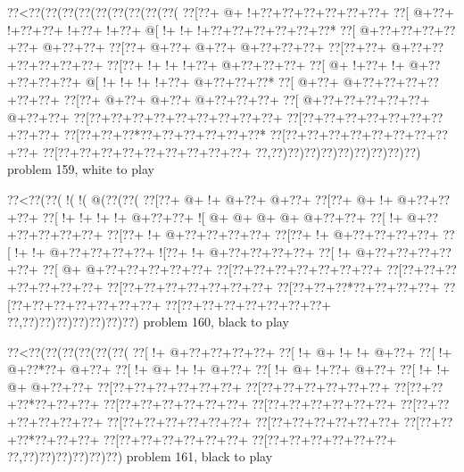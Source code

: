 \vbox{\vbox{\goo
\0??<\0??(\0??(\0??(\0??(\0??(\0??(\0??(\0??(\0??(
\0??[\0??+\- @+\- !+\0??+\0??+\0??+\0??+\0??+\0??+
\0??[\- @+\0??+\- !+\0??+\0??+\- !+\0??+\- !+\0??+
\- @[\- !+\- !+\- !+\0??+\0??+\0??+\0??+\0??+\0??*
\0??[\- @+\0??+\0??+\0??+\0??+\0??+\- @+\0??+\0??+
\0??[\0??+\- @+\0??+\- @+\0??+\- @+\0??+\0??+\0??+
\0??[\0??+\0??+\- @+\0??+\0??+\0??+\0??+\0??+\0??+
\0??[\0??+\- !+\- !+\- !+\0??+\- @+\0??+\0??+\0??+
\0??[\- @+\- !+\0??+\- !+\- @+\0??+\0??+\0??+\0??+
\- @[\- !+\- !+\- !+\- !+\0??+\- @+\0??+\0??+\0??*
\0??[\- @+\0??+\- @+\0??+\0??+\0??+\0??+\0??+\0??+
\0??[\0??+\- @+\0??+\- @+\0??+\- @+\0??+\0??+\0??+
\0??[\- @+\0??+\0??+\0??+\0??+\0??+\- @+\0??+\0??+
\0??[\0??+\0??+\0??+\0??+\0??+\0??+\0??+\0??+\0??+
\0??[\0??+\0??+\0??+\0??+\0??+\0??+\0??+\0??+\0??+
\0??[\0??+\0??+\0??*\0??+\0??+\0??+\0??+\0??+\0??*
\0??[\0??+\0??+\0??+\0??+\0??+\0??+\0??+\0??+\0??+
\0??[\0??+\0??+\0??+\0??+\0??+\0??+\0??+\0??+\0??+
\0??,\0??)\0??)\0??)\0??)\0??)\0??)\0??)\0??)\0??)
}
\hfil problem 159, white to play\hfil\break
}

\vbox{\vbox{\goo
\0??<\0??(\0??(\- !(\- !(\- @(\0??(\0??(
\0??[\0??+\- @+\- !+\- @+\0??+\- @+\0??+
\0??[\0??+\- @+\- !+\- @+\0??+\0??+\0??+
\0??[\- !+\- !+\- !+\- !+\- @+\0??+\0??+
\- ![\- @+\- @+\- @+\- @+\- @+\0??+\0??+
\0??[\- !+\- @+\0??+\0??+\0??+\0??+\0??+
\0??[\0??+\- !+\- @+\0??+\0??+\0??+\0??+
\0??[\0??+\- !+\- @+\0??+\0??+\0??+\0??+
\0??[\- !+\- !+\- @+\0??+\0??+\0??+\0??+
\- ![\0??+\- !+\- @+\0??+\0??+\0??+\0??+
\0??[\- !+\- @+\0??+\0??+\0??+\0??+\0??+
\0??[\- @+\- @+\0??+\0??+\0??+\0??+\0??+
\0??[\0??+\0??+\0??+\0??+\0??+\0??+\0??+
\0??[\0??+\0??+\0??+\0??+\0??+\0??+\0??+
\0??[\0??+\0??+\0??+\0??+\0??+\0??+\0??+
\0??[\0??+\0??+\0??*\0??+\0??+\0??+\0??+
\0??[\0??+\0??+\0??+\0??+\0??+\0??+\0??+
\0??[\0??+\0??+\0??+\0??+\0??+\0??+\0??+
\0??,\0??)\0??)\0??)\0??)\0??)\0??)\0??)
}
\hfil problem 160, black to play\hfil\break
}

\vbox{\vbox{\goo
\0??<\0??(\0??(\0??(\0??(\0??(\0??(
\0??[\- !+\- @+\0??+\0??+\0??+\0??+
\0??[\- !+\- @+\- !+\- !+\- @+\0??+
\0??[\- !+\- @+\0??*\0??+\- @+\0??+
\0??[\- !+\- @+\- !+\- !+\- @+\0??+
\0??[\- !+\- @+\- !+\0??+\- @+\0??+
\0??[\- !+\- !+\- @+\- @+\0??+\0??+
\0??[\0??+\0??+\0??+\0??+\0??+\0??+
\0??[\0??+\0??+\0??+\0??+\0??+\0??+
\0??[\0??+\0??+\0??*\0??+\0??+\0??+
\0??[\0??+\0??+\0??+\0??+\0??+\0??+
\0??[\0??+\0??+\0??+\0??+\0??+\0??+
\0??[\0??+\0??+\0??+\0??+\0??+\0??+
\0??[\0??+\0??+\0??+\0??+\0??+\0??+
\0??[\0??+\0??+\0??+\0??+\0??+\0??+
\0??[\0??+\0??+\0??*\0??+\0??+\0??+
\0??[\0??+\0??+\0??+\0??+\0??+\0??+
\0??[\0??+\0??+\0??+\0??+\0??+\0??+
\0??,\0??)\0??)\0??)\0??)\0??)\0??)
}
\hfil problem 161, black to play\hfil\break
}


